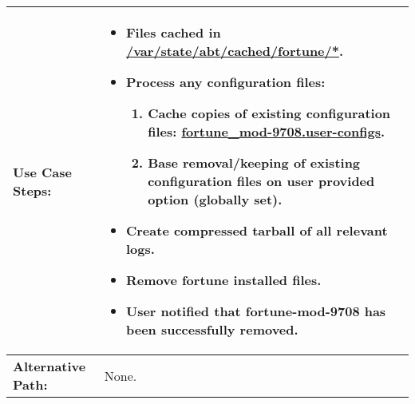 \begin{tabularx}{\linewidth}{|l|X|}
\hline
\textbf{Use Case Steps:} & 
\begin{minipage}{\linewidth} 
  \vspace{0.05em}
  \begin{itemize}
    \item Files cached in \url{/var/state/abt/cached/fortune/*}.
    \item Process any configuration files:
    \begin{enumerate}
      \item Cache copies of existing configuration files: \url{fortune_mod-9708.user-configs}.
      \item Base removal/keeping of existing configuration files on user provided option (globally set).
    \end{enumerate}
    \item Create compressed tarball of all relevant logs.
    \item Remove fortune installed files.
    \item User notified that fortune-mod-9708 has been successfully removed.
  \end{itemize}
  \vspace{0.05em}
\end{minipage}
\\
\hline 
\textbf{Alternative Path:} & None. \\
\hline
\end{tabularx}